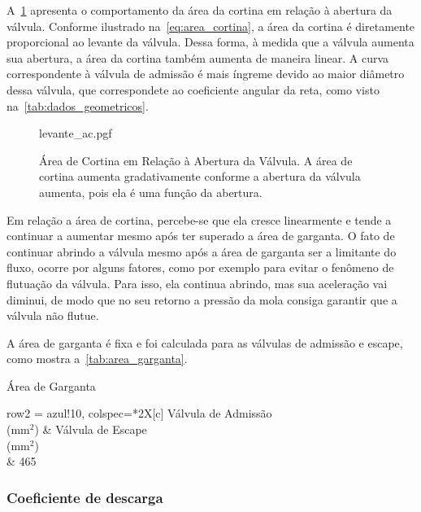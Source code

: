 A~\cref{fig:levante_ac} apresenta o comportamento da área da cortina em relação à abertura da válvula. Conforme ilustrado na~\cref{eq:area_cortina}, a área da cortina é diretamente proporcional ao levante da válvula. 
Dessa forma, à medida que a válvula aumenta sua abertura, a área da cortina também aumenta de maneira linear. 
A curva correspondente à válvula de admissão é mais íngreme devido ao maior diâmetro dessa válvula, que correspondete ao coeficiente angular da reta, como visto na~\cref{tab:dados_geometricos}.
%
\begin{figure}[!htb]
    \centering
    \caption[Área de Cortina em Relação à Abertura da Válvula]{Área de Cortina em Relação à Abertura da Válvula. A área de cortina aumenta gradativamente conforme a abertura da válvula aumenta, pois ela é uma função da abertura.}
    {levante_ac.pgf}
    \label{fig:levante_ac}
\end{figure}
%
Em relação a área de cortina, percebe-se que ela cresce linearmente e tende a continuar a aumentar mesmo após ter superado a área de garganta. 
O fato de continuar abrindo a válvula mesmo após a área de garganta ser a limitante do fluxo, ocorre por alguns fatores, como por exemplo para evitar o fenômeno de flutuação da válvula. 
Para isso, ela continua abrindo, mas sua aceleração vai diminui, de modo que no seu retorno a pressão da mola consiga garantir que a válvula não flutue.

A área de garganta é fixa e foi calculada para as válvulas de admissão e escape, como mostra a~\cref{tab:area_garganta}.
%
\begin{table}[!htb]
    \centering\footnotesize
    \caption{Área de Garganta}
    \begin{tblr}{
        row{2} = azul!10,
        colspec={*{2}{X[c]}}
    }
    \toprule
    {Válvula de Admissão \\ (mm$^2$)} & {Válvula de Escape \\ (mm$^2$)} \\
     & 465 \\
    \bottomrule
    \end{tblr}
    \label{tab:area_garganta}
\end{table}
%
\subsubsection*{Coeficiente de descarga}

